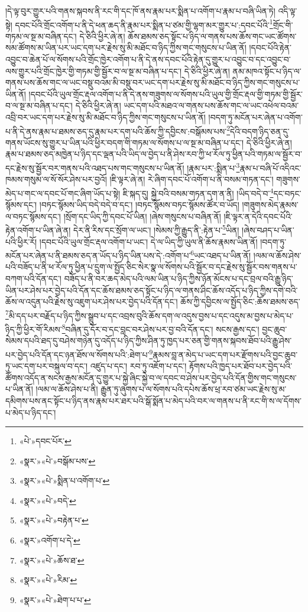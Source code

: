 །དེ་ལྟ་བུར་གྱུར་པའི་གནས་སྐབས་ནི་རང་གི་དང་ཁོ་ནས་རྣམ་པར་སྨིན་པ་འགོག་པ་རྣམ་པ་བཞི་ཡིན་ཏེ། འདི་ལྟ་སྟེ། དབང་པོའི་གྲོང་འགོག་པ་ནི་དེ་ཕན་ཆད་ནི་རྣམ་པར་སྨིན་པ་ཙམ་གྱི་ལྷག་མར་གྱུར་པ་:དབང་པོའི་\footnote{«པེ་»དབང་པོར་}གྲོང་གི་གཏམ་ལ་སྔ་མ་བཞིན་དང་། དེ་ཅིའི་ཕྱིར་ཞེ་ན། ཆོས་ཐམས་ཅད་སྟོང་པ་ཉིད་ལ་གནས་པས་ཆོས་གང་ཡང་ཚོགས་སམ་ཚོགས་མ་ཡིན་པར་ཡང་དག་པར་རྗེས་སུ་མི་མཐོང་བ་ཉིད་ཀྱིས་གང་གསུངས་པ་ཡིན་ནོ། །དབང་པོའི་རྟེན་འབྱུང་བ་ཆེན་པོ་ལ་སོགས་པའི་གྲོང་ཁྱེར་འགོག་པ་ནི་དེ་ནས་དབང་པོའི་རྟེན་དུ་གྱུར་པ་འབྱུང་བ་དང་འབྱུང་བ་ལས་གྱུར་པའི་གྲོང་ཁྱེར་གྱི་གཏམ་གྱི་སྦྱོར་བ་ལ་སྔ་མ་བཞིན་པ་དང་། དེ་ཅིའི་ཕྱིར་ཞེ་ན། ནམ་མཁའ་སྟོང་པ་ཉིད་ལ་གནས་པས་ཆོས་གང་ལ་ཡང་བསྡུ་བའམ་མི་བསྡུ་བར་ཡང་དག་པར་རྗེས་སུ་མི་མཐོང་བ་ཉིད་ཀྱིས་གང་གསུངས་པ་ཡིན་ནོ། །དབང་པོའི་ཡུལ་གྲོང་རྡལ་འགོག་པ་ནི་དེ་ནས་གཟུགས་ལ་སོགས་པའི་ཡུལ་གྱི་གྲོང་རྡལ་གྱི་གཏམ་གྱི་སྦྱོར་བ་ལ་སྔ་མ་བཞིན་པ་དང་། དེ་ཅིའི་ཕྱིར་ཞེ་ན། ཡང་དག་པའི་མཐའ་ལ་གནས་པས་ཆོས་གང་ལ་ཡང་འཕེལ་བའམ་འབྲི་བར་ཡང་དག་པར་རྗེས་སུ་མི་མཐོང་བ་ཉིད་ཀྱིས་གང་གསུངས་པ་ཡིན་ནོ། །བདག་ཏུ་མངོན་པར་ཞེན་པ་འགོག་པ་ནི་དེ་ནས་རྣམ་པ་ཐམས་ཅད་དུ་རྣམ་པར་དག་པའི་ཆོས་ཀྱི་དབྱིངས་:བསྒོམས་པས་\footnote{«སྣར་»«པེ་»བསྒོམ་པས་}དེའི་བདག་ཉིད་ཅན་དུ་གནས་ཡོངས་སུ་གྱུར་པ་ཡིན་པའི་ཕྱིར་བདག་གི་གཏམ་ལ་སོགས་པ་ལ་སྔ་མ་བཞིན་པ་དང་། དེ་ཅིའི་ཕྱིར་ཞེ་ན། རྣམ་པ་ཐམས་ཅད་མཁྱེན་པ་ཉིད་དང་ལྡན་པའི་ཡིད་ལ་བྱེད་པ་ནི་ཤེས་རབ་ཀྱི་ཕ་རོལ་ཏུ་ཕྱིན་པའི་གཏམ་ལ་སྦྱོར་བ་དང་རྗེས་སུ་སྦྱོར་བར་གནས་པའི་འཐད་པས་གང་གསུངས་པ་ཡིན་ནོ། །རྣམ་པར་:སྨིན་པ་\footnote{«སྣར་»«པེ་»སྨིན་པ་འགོག་པ་}རྣམ་པ་བཞི་པོ་འདིའང་ཁམས་གསུམ་ལ་སོ་སོར་ཤེས་པར་བྱའོ། །ཇི་ལྟར་ཞེ་ན། རེ་ཞིག་དབང་པོ་འགོག་པ་ནི་བསམ་གཏན་དང་། གཟུགས་མེད་པ་གང་ལ་དབང་པོ་གང་ཞིག་ཡོད་པ་སྟེ། ཇི་སྐད་དུ། སྐྱེ་བའི་བསམ་གཏན་དག་ན་ནི། །ཡིད་བདེ་བ་\footnote{«སྣར་»«པེ་»བདེ་}དང་བཏང་སྙོམས་དང་། །བཏང་སྙོམས་ཡིད་བདེ་བདེ་བ་དང་། །བཏང་སྙོམས་བཏང་སྙོམས་ཚོར་བ་ཡོད། །གཟུགས་མེད་རྣམས་ལ་བཏང་སྙོམས་དང་། །སྲོག་དང་ཡིད་ཀྱི་དབང་པོ་ཡིན། །ཞེས་གསུངས་པ་བཞིན་ནོ། །ཇི་ལྟར་ན་དེའི་དབང་པོའི་རྟེན་འགོག་པ་ཡིན་ཞེ་ན། དེར་ནི་རིས་དང་སྲོག་ལ་ཡང་། །སེམས་ཀྱི་རྒྱུད་ནི་:རྟེན་པ་\footnote{«སྣར་»«པེ་»བརྟེན་པ་}ཡིན། །ཞེས་བཤད་པ་ཡིན་པའི་ཕྱིར་རོ། །དབང་པོའི་ཡུལ་གྲོང་རྡལ་འགོག་པ་ཡང་། དེ་ལ་ཡིད་ཀྱི་ཡུལ་ནི་ཆོས་རྣམས་ཡིན་ནོ། །བདག་ཏུ་མངོན་པར་ཞེན་པ་ནི་ཐམས་ཅད་ན་ཡོད་པ་ཉིད་ཡིན་པས་དེ་:འགོག་པ་\footnote{«སྣར་»འགོག་པ་དེ་}ཡང་འཐད་པ་ཡིན་ནོ། །ལམ་ལ་ཆོས་ཤེས་པའི་བཟོད་པ་ནི་ཕ་རོལ་ཏུ་ཕྱིན་པ་དྲུག་ལ་སྤྱོད་ཅིང་སེར་སྣ་ལ་སོགས་པའི་སྦྱོར་བ་དང་རྗེས་སུ་སྦྱོར་བས་གནས་པ་བཀག་པའི་དོན་དང་། བཟོད་པ་ནི་བར་ཆད་མེད་པའི་ལམ་ཡིན་པ་ཉིད་ཀྱིས་ཉོན་མོངས་པ་དང་བྲལ་བའི་རྒྱུ་ཉིད་ཡིན་པར་ཤེས་པར་བྱེད་པའི་དོན་དང་ཆོས་ཐམས་ཅད་སྟོང་པ་ཉིད་ལ་གནས་ཤིང་ཆོས་འདོད་པ་ཉིད་ཀྱིས་དགེ་བའི་ཆོས་ལ་འདུན་པའི་རྗེས་སུ་འཇུག་པར་ཤེས་པར་བྱེད་པའི་དོན་དང་། ཆོས་ཀྱི་དབྱིངས་ལ་སྤྱོད་ཅིང་:ཆོས་ཐམས་ཅད་\footnote{«སྣར་»«པེ་»ཆོས་ཐ་}མི་དད་པར་བརྗོད་པ་ཉིད་ཀྱིས་སྒྲུབ་པ་དང་འབྲས་བུའི་ཆོས་དག་ལ་འདུས་བྱས་པ་དང་འདུས་མ་བྱས་པ་མེད་པ་ཉིད་ཀྱི་ཕྱིར་གོ་རིམས་\footnote{«སྣར་»«པེ་»རིམ་}བཞིན་དུ་དོར་བ་དང་བླང་བར་ཤེས་པར་བྱ་བའི་དོན་དང་། སངས་རྒྱས་དང་། བྱང་ཆུབ་སེམས་དཔའི་ཐད་དུ་བཤེས་གཉེན་དུ་འདོད་པ་ཉིད་ཀྱིས་ཤིན་ཏུ་ཁྱད་པར་ཅན་གྱི་གནས་སྐབས་ཐོབ་པའི་རྒྱུ་ཤེས་པར་བྱེད་པའི་དོན་དང་ཉན་ཐོས་ལ་སོགས་པའི་:ཐེག་པ་\footnote{«སྣར་»«པེ་»ཐེག་པ་པ་}རྣམས་བླ་ན་མེད་པ་ཡང་དག་པར་རྫོགས་པའི་བྱང་ཆུབ་ཏུ་ཡང་དག་པར་བསྐུལ་བ་དང་། འཛུད་པ་དང་། རབ་ཏུ་འཇོག་པ་དང་། རྟོགས་པའི་ཁྱད་པར་ཐོབ་པར་བྱེད་པའི་ཚོགས་འདོད་ན་སངས་རྒྱས་མངོན་དུ་གྱུར་པ་སྐྱེ་ཞིང་སྐྱེ་བ་ལ་དབང་བ་ཤེས་པར་བྱེད་པའི་དོན་གྱིས་གང་གསུངས་པ་ཡིན་ནོ། །ལམ་ལ་ཆོས་ཤེས་པ་ནི། རྒྱུན་ཏུ་ཞུགས་པ་ལ་སོགས་པའི་དཔེས་ཆོས་ཕྲ་རབ་ཙམ་ཡང་རྗེས་སུ་མ་དམིགས་པས་ནང་སྟོང་པ་ཉིད་ནས་རྣམ་པར་ཐར་པའི་སྒོ་སྨོན་པ་མེད་པའི་བར་ལ་གནས་པ་ནི་རང་གི་ས་ལ་དོགས་པ་མེད་པ་ཉིད་དང་། 